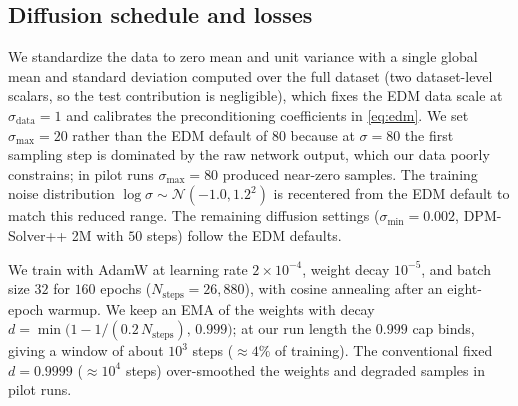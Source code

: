 \documentclass[10pt]{article} %
\begin{document}
\subsection{Diffusion schedule and losses}
\label{sec:losses}

We standardize the data to zero mean and unit variance with a single global mean and standard deviation computed over the full dataset (two dataset-level scalars, so the test contribution is negligible), which fixes the EDM data scale at $\sigma_{\text{data}} = 1$ and calibrates the preconditioning coefficients in \eqref{eq:edm}. We set $\sigma_{\max} = 20$ rather than the EDM default of $80$ because at $\sigma = 80$ the first sampling step is dominated by the raw network output, which our data poorly constrains; in pilot runs $\sigma_{\max}=80$ produced near-zero samples. The training noise distribution $\log \sigma \sim \mathcal{N}(-1.0, 1.2^2)$ is recentered from the EDM default to match this reduced range. The remaining diffusion settings ($\sigma_{\min} = 0.002$, DPM-Solver++ 2M with $50$ steps) follow the EDM defaults.

We train with AdamW \citep{loshchilov2019decoupled} at learning rate $2 \times 10^{-4}$, weight decay $10^{-5}$, and batch size $32$ for $160$ epochs ($N_{\text{steps}} = 26{,}880$), with cosine annealing after an eight-epoch warmup. We keep an EMA of the weights with decay $d = \min\!\big(1 - 1/(0.2\,N_{\text{steps}}),\, 0.999\big)$; at our run length the $0.999$ cap binds, giving a window of about $10^{3}$ steps ($\approx 4\%$ of training). The conventional fixed $d = 0.9999$ ($\approx 10^{4}$ steps) over-smoothed the weights and degraded samples in pilot runs.
\end{document}
